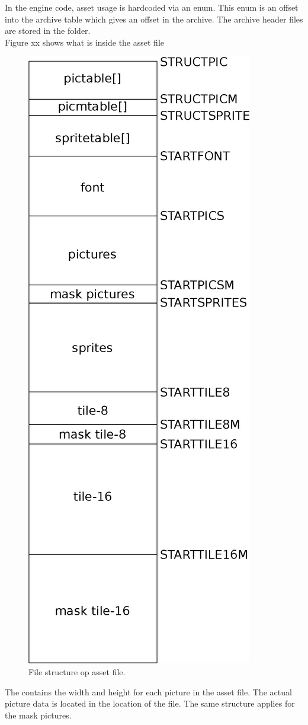 \documentclass[book.tex]{subfiles}
\begin{document}
 In the engine code, asset usage is hardcoded via an enum. This enum is an offset into the archive  table which gives an offset in the  archive. The archive header files are stored in the  folder.\\

Figure xx shows what is inside the  asset file
\begin{figure}[H]
\centering
 \includegraphics[width=.5\textwidth]{imgs/drawings/graphic_assets.eps}
 \caption{File structure op  asset file.}
 \label{asset-creation-pipeline}
\end{figure}

The  contains the width and height for each picture in the asset file. The actual picture data is located in the  location of the file. The same structure applies for the mask pictures.\\
\end{document}
